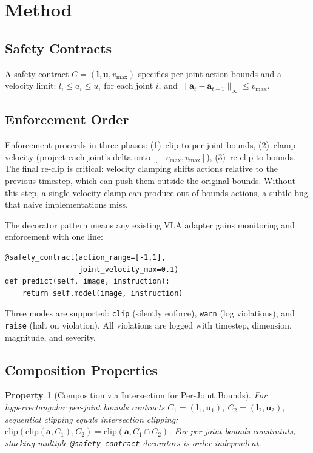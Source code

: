 \documentclass[conference]{IEEEtran}
\newtheorem{property}{Property}
\begin{document}
\section{Method}

\subsection{Safety Contracts}

A safety contract $C = (\mathbf{l}, \mathbf{u}, v_{\max})$ specifies per-joint action bounds and a velocity limit:
$l_i \leq a_i \leq u_i$ for each joint $i$, and $\|\mathbf{a}_t - \mathbf{a}_{t-1}\|_\infty \leq v_{\max}$.

\subsection{Enforcement Order}
\label{sec:enforcement}

Enforcement proceeds in three phases: (1)~clip to per-joint bounds, (2)~clamp velocity (project each joint's delta onto $[-v_{\max}, v_{\max}]$), (3)~re-clip to bounds.
The final re-clip is critical: velocity clamping shifts actions relative to the previous timestep, which can push them outside the original bounds.
Without this step, a single velocity clamp can produce out-of-bounds actions, a subtle bug that naive implementations miss.

The decorator pattern means any existing VLA adapter gains monitoring and enforcement with one line:

{\small
\begin{verbatim}
@safety_contract(action_range=[-1,1],
                 joint_velocity_max=0.1)
def predict(self, image, instruction):
    return self.model(image, instruction)
\end{verbatim}
}

Three modes are supported: \texttt{clip} (silently enforce), \texttt{warn} (log violations), and \texttt{raise} (halt on violation). All violations are logged with timestep, dimension, magnitude, and severity.


\subsection{Composition Properties}

\begin{property}[Composition via Intersection for Per-Joint Bounds]
\label{prop:composition}
For hyperrectangular per-joint bounds contracts $C_1 = (\mathbf{l}_1, \mathbf{u}_1)$, $C_2 = (\mathbf{l}_2, \mathbf{u}_2)$, sequential clipping equals intersection clipping:
$\text{clip}(\text{clip}(\mathbf{a}, C_1), C_2) = \text{clip}(\mathbf{a}, C_1 \cap C_2)$.
For per-joint bounds constraints, stacking multiple \texttt{@safety\_contract} decorators is order-independent.
\end{property}
\end{document}
